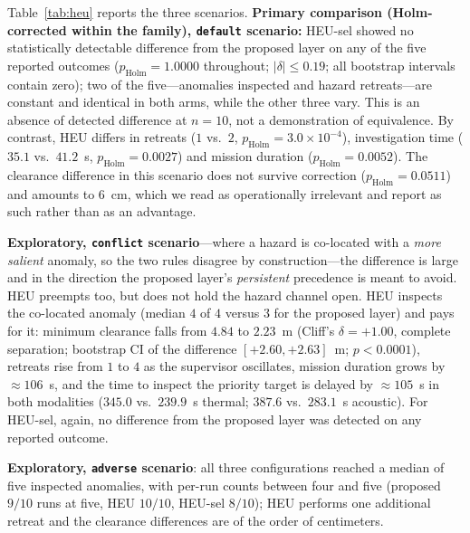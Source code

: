 Table~\ref{tab:heu} reports the three scenarios. \textbf{Primary comparison
(Holm-corrected within the family), \texttt{default} scenario:} HEU-sel showed
no statistically detectable difference from the proposed layer on any of the five
reported outcomes ($p_{\mathrm{Holm}}=1.0000$ throughout; $|\delta|\le0.19$;
all bootstrap intervals contain zero); two of the five---anomalies inspected and
hazard retreats---are constant and identical in both arms, while the other three
vary. This is an absence of detected difference at $n=10$, not a
demonstration of equivalence. By contrast, HEU differs in retreats ($1$ vs.\ $2$,
$p_{\mathrm{Holm}}=3.0{\times}10^{-4}$), investigation time ($35.1$ vs.\ $41.2$~s,
$p_{\mathrm{Holm}}=0.0027$) and mission duration ($p_{\mathrm{Holm}}=0.0052$). The
clearance difference in this scenario does not survive correction
($p_{\mathrm{Holm}}=0.0511$) and amounts to $6$~cm, which we read as operationally
irrelevant and report as such rather than as an advantage.

\textbf{Exploratory, \texttt{conflict} scenario}---where a hazard is co-located with a
\emph{more salient} anomaly, so the two rules disagree by construction---the
difference is large and in the direction the proposed layer's \emph{persistent}
precedence is meant to avoid. HEU preempts too, but does not hold the hazard
channel open. HEU
inspects the co-located anomaly (median $4$ of $4$ versus $3$ for the proposed layer)
and pays for it: minimum clearance falls from $4.84$ to $2.23$~m (Cliff's
$\delta=+1.00$, complete separation; bootstrap CI of the difference
$[+2.60,+2.63]$~m; $p<0.0001$), retreats rise from $1$ to $4$ as the supervisor
oscillates, mission duration grows by ${\approx}106$~s, and the time to inspect the
priority target is delayed by ${\approx}105$~s in both modalities
($345.0$ vs.\ $239.9$~s thermal; $387.6$ vs.\ $283.1$~s acoustic). For HEU-sel,
again, no difference from the proposed layer was detected on any reported outcome.

\textbf{Exploratory, \texttt{adverse} scenario}: all three configurations reached a
median of five inspected anomalies, with per-run counts between four and five
(proposed $9/10$ runs at five, HEU $10/10$, HEU-sel $8/10$); HEU performs one
additional retreat and the clearance differences are of the order of centimeters.

